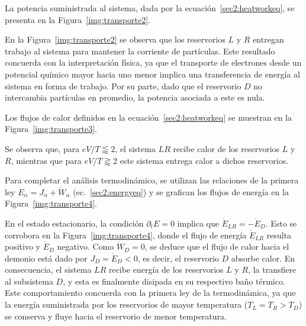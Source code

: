 La potencia suministrada al sistema, dada por la ecuación~\eqref{sec2:heatworkeq}, se presenta en la Figura~\ref{img:transporte2}.  

    
En la Figura~\ref{img:transporte2} se observa que los reservorios $L$ y $R$ entregan trabajo al sistema para mantener la corriente de partículas. Este resultado concuerda con la interpretación física, ya que el transporte de electrones desde un potencial químico mayor hacia uno menor implica una transferencia de energía al sistema en forma de trabajo. Por su parte, dado que el reservorio $D$ no intercambia partículas en promedio, la potencia asociada a este es nula.  

Los flujos de calor definidos en la ecuación~\eqref{sec2:heatworkeq} se muestran en la Figura~\ref{img:transporte3}.  

    
Se observa que, para $eV/T \lessapprox 2$, el sistema $LR$ recibe calor de los reservorios $L$ y $R$, mientras que para $eV/T \gtrapprox 2$ este sistema entrega calor a dichos reservorios.  

Para completar el análisis termodinámico, se utilizan las relaciones de la primera ley $\dot{E}_{\alpha} = J_{\alpha} + \dot{W}_{\alpha}$ (ec.~\eqref{sec2:energyeq}) y se grafican los flujos de energía en la Figura~\ref{img:transporte4}.  


En el estado estacionario, la condición $\partial_t E = 0$ implica que $\dot{E}_{LR} = -\dot{E}_D$. Esto se corrobora en la Figura~\ref{img:transporte4}, donde el flujo de energía $\dot{E}_{LR}$ resulta positivo y $\dot{E}_D$ negativo. Como $\dot{W}_{D} = 0$, se deduce que el flujo de calor hacia el demonio está dado por $J_D = \dot{E}_D < 0$, es decir, el reservorio $D$ absorbe calor. En consecuencia, el sistema $LR$ recibe energía de los reservorios $L$ y $R$, la transfiere al subsistema $D$, y esta es finalmente disipada en su respectivo baño térmico. Este comportamiento concuerda con la primera ley de la termodinámica, ya que la energía suministrada por los reservorios de mayor temperatura ($T_L = T_R > T_D$) se conserva y fluye hacia el reservorio de menor temperatura.  

